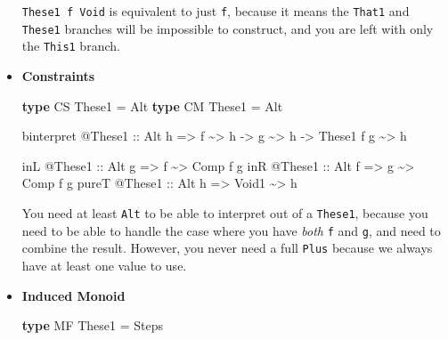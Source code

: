 \documentclass[]{article}
\newenvironment{Shaded}{}{}
\newcommand{\DataTypeTok}[1]{\textcolor[rgb]{0.56,0.13,0.00}{#1}}
\newcommand{\KeywordTok}[1]{\textcolor[rgb]{0.00,0.44,0.13}{\textbf{#1}}}
\newcommand{\NormalTok}[1]{#1}
\newcommand{\OperatorTok}[1]{\textcolor[rgb]{0.40,0.40,0.40}{#1}}
\newcommand{\OtherTok}[1]{\textcolor[rgb]{0.00,0.44,0.13}{#1}}
\begin{document}
\begin{itemize}
  \texttt{These1\ f\ Void} is equivalent to just \texttt{f}, because it means
  the \texttt{That1} and \texttt{These1} branches will be impossible to
  construct, and you are left with only the \texttt{This1} branch.
\item
  \textbf{Constraints}

\begin{Shaded}
\begin{Highlighting}[]
\KeywordTok{type} \DataTypeTok{CS} \DataTypeTok{These1} \OtherTok{=} \DataTypeTok{Alt}
\KeywordTok{type} \DataTypeTok{CM} \DataTypeTok{These1} \OtherTok{=} \DataTypeTok{Alt}

\NormalTok{binterpret }\OperatorTok{@}\DataTypeTok{These1}
\OtherTok{    ::} \DataTypeTok{Alt}\NormalTok{ h}
    \OtherTok{=>}\NormalTok{ f }\OperatorTok{\textasciitilde{}>}\NormalTok{ h}
    \OtherTok{{-}>}\NormalTok{ g }\OperatorTok{\textasciitilde{}>}\NormalTok{ h}
    \OtherTok{{-}>} \DataTypeTok{These1}\NormalTok{ f g }\OperatorTok{\textasciitilde{}>}\NormalTok{ h}

\NormalTok{inL   }\OperatorTok{@}\DataTypeTok{These1}\OtherTok{ ::} \DataTypeTok{Alt}\NormalTok{ g }\OtherTok{=>}\NormalTok{ f     }\OperatorTok{\textasciitilde{}>} \DataTypeTok{Comp}\NormalTok{ f g}
\NormalTok{inR   }\OperatorTok{@}\DataTypeTok{These1}\OtherTok{ ::} \DataTypeTok{Alt}\NormalTok{ f }\OtherTok{=>}\NormalTok{ g     }\OperatorTok{\textasciitilde{}>} \DataTypeTok{Comp}\NormalTok{ f g}
\NormalTok{pureT }\OperatorTok{@}\DataTypeTok{These1}\OtherTok{ ::} \DataTypeTok{Alt}\NormalTok{ h }\OtherTok{=>} \DataTypeTok{Void1} \OperatorTok{\textasciitilde{}>}\NormalTok{ h}
\end{Highlighting}
\end{Shaded}

  You need at least \texttt{Alt} to be able to interpret out of a
  \texttt{These1}, because you need to be able to handle the case where you have
  \emph{both} \texttt{f} and \texttt{g}, and need to combine the result.
  However, you never need a full \texttt{Plus} because we always have at least
  one value to use.
\item
  \textbf{Induced Monoid}

\begin{Shaded}
\begin{Highlighting}[]
\KeywordTok{type} \DataTypeTok{MF} \DataTypeTok{These1} \OtherTok{=} \DataTypeTok{Steps}
\end{Highlighting}
\end{Shaded}


\end{itemize}
\end{document}
